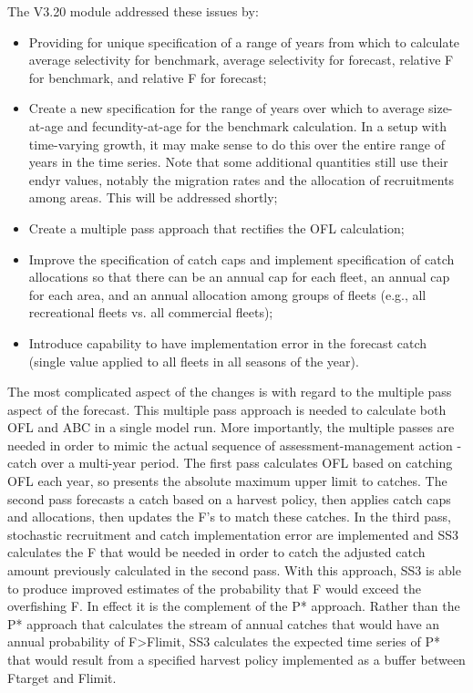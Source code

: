 The V3.20 module addressed these issues by:
\begin{itemize}
	\item Providing for unique specification of a range of years from which to calculate average selectivity for benchmark, average selectivity for forecast, relative F for benchmark, and relative F for forecast;
	\item Create a new specification for the range of years over which to average size-at-age and fecundity-at-age for the benchmark calculation.  In a setup with time-varying growth, it may make sense to do this over the entire range of years in the time series.  Note that some additional quantities still use their endyr values, notably the migration rates and the allocation of recruitments among areas.  This will be addressed shortly;
	\item Create a multiple pass approach that rectifies the OFL calculation;
	\item Improve the specification of catch caps and implement specification of catch allocations so that there can be an annual cap for each fleet, an annual cap for each area, and an annual allocation among groups of fleets (e.g., all recreational fleets vs. all commercial fleets);
	\item Introduce capability to have implementation error in the forecast catch (single value applied to all fleets in all seasons of the year).
\end{itemize}

The most complicated aspect of the changes is with regard to the multiple pass aspect of the forecast.  This multiple pass approach is needed to calculate both OFL and ABC in a single model run.  More importantly, the multiple passes are needed in order to mimic the actual sequence of assessment-management action - catch over a multi-year period.  The first pass calculates OFL based on catching OFL each year, so presents the absolute maximum upper limit to catches.  The second pass forecasts a catch based on a harvest policy, then applies catch caps and allocations, then updates the F's to match these catches.  In the third pass, stochastic recruitment and catch implementation error are implemented and SS3 calculates the F that would be needed in order to catch the adjusted catch amount previously calculated in the second pass.  With this approach, SS3 is able to produce improved estimates of the probability that F would exceed the overfishing F.  In effect it is the complement of the P* approach.  Rather than the P* approach that calculates the stream of annual catches that would have an annual probability of F>Flimit, SS3 calculates the expected time series of P* that would result from a specified harvest policy implemented as a buffer between Ftarget and Flimit.

